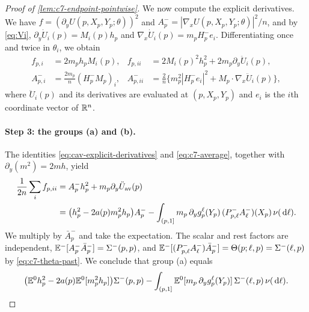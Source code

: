 \begin{proof}[Proof of \cref{lem:c7-endpoint-pointwise}]
We now compute the explicit derivatives. We have
$f=(\partial_yU(p,X_p,Y_p;\theta))^2$ and
$A_p^-=|\nabla_xU(p,X_p,Y_p;\theta)|^2/n$, and by \eqref{eq:Vi},
$\partial_y\dot U_i(p)=M_i(p)h_p$ and $\nabla_x\dot U_i(p)=m_pH_p^-e_i$.
Differentiating once and twice in $\theta_i$, we obtain
\begin{align}
 f_{p,i}&=2m_ph_pM_i(p),&
 f_{p,ii}&=2M_i(p)^2h_p^2+2m_p\partial_y\ddot U_i(p),\nonumber\\
 A_{p,i}^-&=\frac{2m_p}{n}(H_p^-M_p)_i,&
 A_{p,ii}^-&=\frac2n\bigl\{m_p^2|H_p^-e_i|^2+
                         M_p\cdot\nabla_x\ddot U_i(p)\bigr\},
 \label{eq:cav-explicit-derivatives}
\end{align}
where $\ddot U_i(p)$ and its derivatives are evaluated at
$(p,X_p,Y_p)$ and $e_i$ is the $i$th coordinate vector of $\mathbb R^n$.

\paragraph{Step 3: the groups (a) and (b).}
The identities \eqref{eq:cav-explicit-derivatives} and
\eqref{eq:c7-average}, together with $\partial_y(m^2)=2mh$, yield
\[
 \begin{aligned}
 \frac1{2n}\sum_if_{p,ii}&=A_p^-h_p^2+m_p\partial_y\ddot U_{\rm av}(p)\\
 &=\bigl(h_p^2-2a(p)m_p^2h_p\bigr)A_p^-
 -\int_{(p,1]}m_p\,\partial_yg_p^\ell(Y_p)\,
 (P^-_{p,\ell}A_\ell^-)(X_p)\,\nu(\,\mathrm d\ell).
 \end{aligned}
\]
We multiply by $\bar A_p^-$ and take the expectation. The scalar and
rest factors are independent, $\mathbb E^-[A_p^-\bar A_p^-]=\Sigma^-(p,p)$,
and $\mathbb E^-[(P^-_{p,\ell}A_\ell^-)\bar A_p^-]=\Theta(p;\ell,p)
=\Sigma^-(\ell,p)$ by \eqref{eq:c7-theta-past}. We conclude that group
(a) equals
\begin{equation}\label{eq:c7-group-a}
 \bigl(\mathbb E^0h_p^2-2a(p)\mathbb E^0[m_p^2h_p]\bigr)\Sigma^-(p,p)
 -\int_{(p,1]}\mathbb E^0[m_p\,\partial_yg_p^\ell(Y_p)]\,
                                  \Sigma^-(\ell,p)\,\nu(\,\mathrm d\ell).
\end{equation}


\end{proof}
